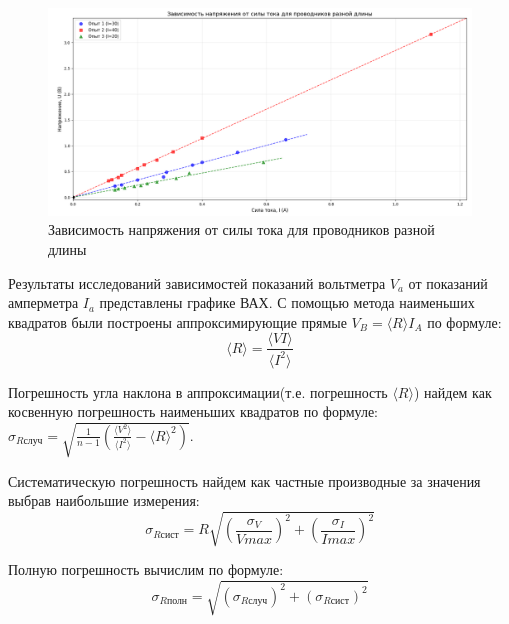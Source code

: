 \documentclass[a4paper]{article}
\begin{document}
\begin{figure}[h]
\centering
\includegraphics[width=0.8\linewidth]{ВАХ.png}
\caption{Зависимость напряжения от силы тока для проводников разной длины}
\label{fig:voltage_current}
\end{figure}



Результаты исследований зависимостей показаний вольтметра $V_{a}$  от показаний амперметра $I_{a}$ представлены графике ВАХ.
С помощью метода наименьших квадратов были построены аппроксимирующие прямые $V_{B} = \langle R \rangle I_{A}$ по формуле: \[ \langle R \rangle = \frac{\langle VI \rangle}{\langle I^2 \rangle}\]\par
Погрешность угла наклона в аппроксимации(т.е. погрешность $\langle R \rangle$) найдем как косвенную погрешность наименьших квадратов по формуле: $\sigma_{R\text{случ}} = \sqrt{\frac{1}{n-1}(\frac{\langle V^2 \rangle}{\langle I^2 \rangle}-\langle R \rangle^2)}$.\par
Систематическую погрешность найдем как частные производные за значения выбрав наибольшие измерения: \[ \sigma_{R\text{сист}} = R \sqrt{\left(  \frac{\sigma_{V}}{Vmax}\right)^2 + \left(\frac{\sigma_{I}}{Imax}\right)^2}  \] \par
Полную погрешность вычислим по формуле: \[\sigma_{R\text{полн}} = \sqrt{\left( \sigma_{R\text{случ}}\right)^2 + \left( \sigma_{R\text{сист}}\right)^2} \] \par
\end{document}
